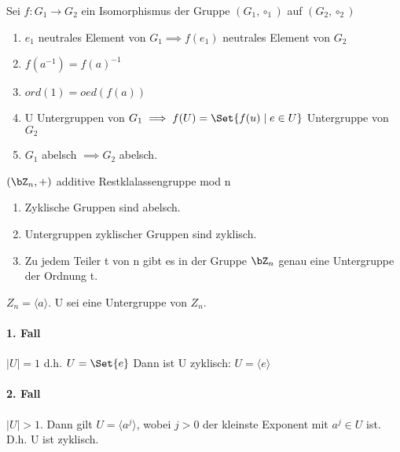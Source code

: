 Sei $f: G_1 \rightarrow G_2$ ein Isomorphismus der Gruppe $(G_1, \circ_1)$ auf $(G_2, \circ_2)$
\begin{enumerate}
\item $e_1$ neutrales Element von $G_1 \implies f(e_1)$ neutrales Element von $G_2$
\item $f(a^{-1}) = f(a)^{-1}$ 
\item $ord (1) = oed (f(a))$
\item U Untergruppen von $G_1 \implies f(U) = \Set{f(u) \mid e \in U}$ Untergruppe von $G_2$
\item $G_1$ abelsch $\implies G_2$ abelsch.
\end{enumerate}
$(\bZ_n, +)$ additive Restklalassengruppe mod n
\begin{enumerate}
\item Zyklische Gruppen sind abelsch.
\item Untergruppen zyklischer Gruppen sind zyklisch.
\item Zu jedem Teiler t von n gibt es in der Gruppe $\bZ_n$ genau eine Untergruppe der Ordnung t.
\end{enumerate}
$Z_n = \langle a \rangle$. U sei eine Untergruppe von $Z_n$.

\paragraph{1. Fall}

$|U| = 1$ d.h. $U = \Set{e}$ Dann ist U zyklisch: $U = \langle e \rangle$

\paragraph{2. Fall}

$|U| > 1$. Dann gilt $U = \langle a^j \rangle$, wobei $j > 0$ der kleinste Exponent mit $a^j \in U$ ist.
D.h. U ist zyklisch.

